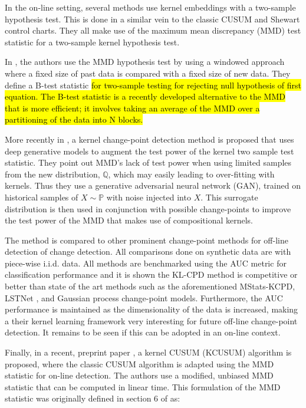 In the on-line setting, several methods use kernel embeddings with a two-sample hypothesis test. This is done in a similar vein to the classic CUSUM and Shewart control charts. They all make use of the maximum mean discrepancy (MMD) test statistic for a two-sample kernel hypothesis test. 


In  \cite{li2015m}, the authors use the MMD hypothesis test by using a windowed approach where a fixed size of past data is compared with a fixed size of new data. They define a B-test statistic \hl{for two-sample testing for rejecting null hypothesis of first equation. The B-test statistic is a recently developed alternative to the MMD that is more efficient; it involves taking an average of the MMD over a partitioning of the data into N blocks.}%

More recently in \cite{chang2019kernel}, a  kernel change-point detection method is proposed that uses deep generative models to augment the test power of the kernel two sample test statistic. They point out MMD's lack of test power when using limited samples from the new distribution, $\mathbb{Q}$, which may easily leading to over-fitting with kernels. Thus they use a generative adversarial neural network (GAN), trained on historical samples of $X \sim  \mathbb{P}$  with noise injected into $X$. This surrogate distribution is then used in conjunction with possible change-points to improve the test power of the MMD that makes use of compositional kernels.

The method is compared to other prominent change-point methods for off-line detection of change detection. All comparisons done on synthetic data are with piece-wise i.i.d. data. All methods are benchmarked using the AUC metric for classification performance and it is shown the KL-CPD method is competitive or better than state of the art methods such as the aforementioned MStats-KCPD, LSTNet , and Gaussian process change-point models.  Furthermore, the AUC performance is maintained as the dimensionality of the data is increased, making a their kernel learning framework very interesting for future off-line change-point detection. It remains to be seen if this can be adopted in an on-line context. 


Finally, in a recent, preprint paper \cite{flynn2019change}, a kernel CUSUM (KCUSUM) algorithm is proposed, where the classic CUSUM algorithm is adapted using the MMD statistic for on-line detection. The authors use a modified, unbiased MMD statistic that can be computed in linear time. This formulation of the MMD statistic was originally defined in section 6 of \cite{gretton2012kernel} as:

